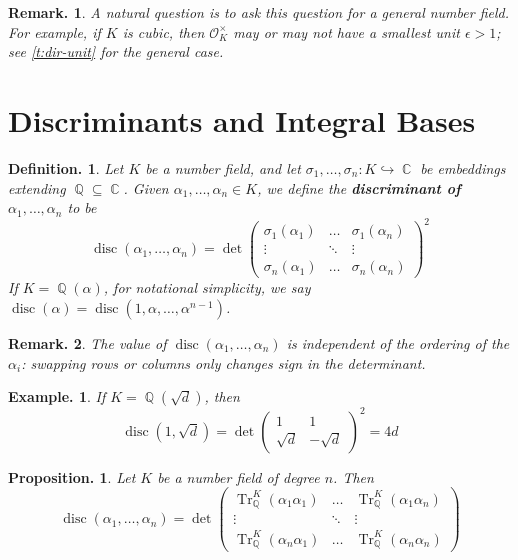 \documentclass[11pt, a4paper]{memoir}
\DeclareMathOperator{\Q}{{\mathbb{Q}}}
\DeclareMathOperator{\C}{{\mathbb{C}}}
\newcommand{\hto}[0]{\ensuremath{\hookrightarrow}}
\theoremstyle{change}
\newtheorem{proposition}[theorem]{Proposition.}
\theoremstyle{plain}
\theoremstyle{nonumberplain}
\newtheorem{definition}{Definition.}
\newtheorem{example}{Example.}
\newtheorem{remark}{Remark.}
\DeclareMathOperator{\disc}{disc}
\DeclareMathOperator{\Tr}{Tr}
\newcommand{\mbf}[1]{{\boldmath\bfseries #1}}
\numberwithin{equation}{section}
\begin{document}
\begin{remark}
    A natural question is to ask this question for a general number field.
    For example, if $K$ is cubic, then $\mathcal{O}_K^\times$ may or may not have a smallest unit $\epsilon>1$; see \cref{t:dir-unit} for the general case.
\end{remark}
\section{Discriminants and Integral Bases}
\begin{definition}
    Let $K$ be a number field, and let $\sigma_1,\ldots,\sigma_n:K\hto\C$ be embeddings extending $\Q\subseteq\C$.
    Given $\alpha_1,\ldots,\alpha_n\in K$, we define the \mbf{discriminant of $\alpha_1,\ldots,\alpha_n$} to be
    \begin{equation*}
        \disc(\alpha_1,\ldots,\alpha_n)=\det
        \begin{pmatrix}
            \sigma_1(\alpha_1) & \hdots & \sigma_1(\alpha_n)\\
            \vdots &\ddots&\vdots\\
            \sigma_n(\alpha_1) & \hdots & \sigma_n(\alpha_n)
        \end{pmatrix}^2
    \end{equation*}
    If $K=\Q(\alpha)$, for notational simplicity, we say $\disc(\alpha)=\disc(1,\alpha,\ldots,\alpha^{n-1})$.
\end{definition}
\begin{remark}
    The value of $\disc(\alpha_1,\ldots,\alpha_n)$ is independent of the ordering of the $\alpha_i$: swapping rows or columns only changes sign in the determinant.
\end{remark}
\begin{example}
    If $K=\Q(\sqrt{d})$, then
    \begin{equation*}\disc(1,\sqrt{d})=\det\begin{pmatrix}1&1\\\sqrt{d}&-\sqrt{d}\end{pmatrix}^2=4d\end{equation*}
\end{example}
\begin{proposition}
    Let $K$ be a number field of degree $n$.
    Then
    \begin{equation*}
        \disc(\alpha_1,\ldots,\alpha_n)=\det
        \begin{pmatrix}
            \Tr_{\Q}^K(\alpha_1\alpha_1)&\hdots&\Tr_{\Q}^K(\alpha_1\alpha_n)\\
            \vdots&\ddots&\vdots\\
            \Tr_{\Q}^K(\alpha_n\alpha_1)&\hdots&\Tr_{\Q}^K(\alpha_n\alpha_n)
        \end{pmatrix}
    \end{equation*}
\end{proposition}
\end{document}
